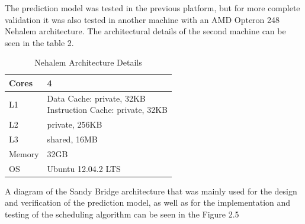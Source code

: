 \documentclass[diploma]{Styles/softlab-thesis}
\begin{document}
The prediction model was tested in the previous platform, but for more complete validation it was also tested in another machine with an AMD Opteron 248 Nehalem architecture. The architectural details of the second machine can be seen in the table 2.

\begin{table}[h]
\begin{center}
\caption{Nehalem Architecture Details}
\begin{tabular}{ | l | l | }
    \hline
    Cores & 4 \\ \hline
    L1 & \makecell{Data Cache: private, 32KB \\ Instruction Cache: private, 32KB} \\ \hline
    L2 & private, 256KB \\ \hline
    L3 & shared, 16MB\  \\ \hline
    Memory &  32GB \\ \hline
    OS & Ubuntu 12.04.2 LTS \\ \hline
\end{tabular}
\end{center}
\end{table}

A diagram of the Sandy Bridge architecture that was mainly used for the design and verification of the prediction model, as well as for the implementation and testing of the scheduling algorithm can be seen in the Figure 2.5 \\
\end{document}
